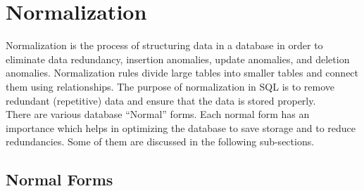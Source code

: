 \section{Normalization}\label{sec:norm}
Normalization is the process of structuring data in a database in order to eliminate data redundancy, insertion anomalies, update anomalies, and deletion anomalies. Normalization rules divide large tables into smaller tables and connect them using relationships. The purpose of normalization in SQL is to remove redundant (repetitive) data and ensure that the data is stored properly.\\
There are various database “Normal” forms. Each normal form has an importance which helps in optimizing the database to save storage and to reduce redundancies. Some of them are discussed in the following sub-sections.

\subsection{Normal Forms}\label{sub-sec:normal-forms}

